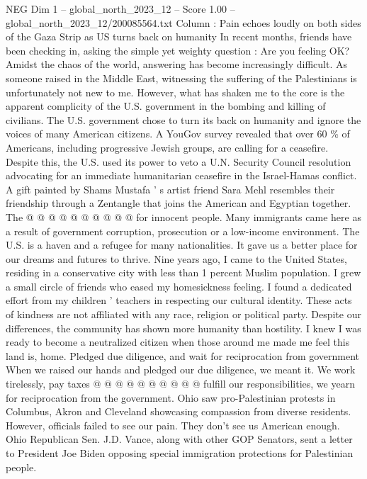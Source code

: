 \begin{textsample}{NEG Dim 1 – global\_north\_2023\_12 – Score 1.00 – global\_north\_2023\_12/200085564.txt}  \label{ex:f1_neg_203}
Column : Pain echoes loudly on both sides of the Gaza Strip as US turns back on humanity In recent months, friends have been checking in, asking the simple yet weighty question : Are you feeling OK?
Amidst the chaos of the world, answering has become increasingly difficult.
As someone raised in the Middle East, witnessing the suffering of the Palestinians is unfortunately not new to me.
However, what has shaken me to the core is the apparent complicity of the U.S. government in the bombing and killing of civilians.
The U.S. government chose to turn its back on humanity and ignore the voices of many American citizens.
A YouGov survey revealed that over 60 \% of Americans, including progressive Jewish groups, are calling for a ceasefire.
Despite this, the U.S. used its power to veto a U.N.
Security Council resolution advocating for an immediate humanitarian ceasefire in the Israel-Hamas conflict.
A gift painted by Shams Mustafa ' s artist friend Sara Mehl resembles their friendship through a Zentangle that joins the American and Egyptian together.
The @ @ @ @ @ @ @ @ @ @ for innocent people.
Many immigrants came here as a result of government corruption, prosecution or a low-income environment.
The U.S. is a haven and a refugee for many nationalities.
It gave us a better place for our dreams and futures to thrive.
Nine years ago, I came to the United States, residing in a conservative city with less than 1 percent Muslim population.
I grew a small circle of friends who eased my homesickness feeling.
I found a dedicated effort from my children ' teachers in respecting our cultural identity.
These acts of kindness are not affiliated with any race, religion or political party.
Despite our differences, the community has shown more humanity than hostility.
I knew I was ready to become a neutralized citizen when those around me made me feel this land is, home.
Pledged due diligence, and wait for reciprocation from government When we raised our hands and pledged our due diligence, we meant it.
We work tirelessly, pay taxes @ @ @ @ @ @ @ @ @ @ fulfill our responsibilities, we yearn for reciprocation from the government.
Ohio saw pro-Palestinian protests in Columbus, Akron and Cleveland showcasing compassion from diverse residents.
However, officials failed to see our pain.
They don't see us American enough.
Ohio Republican Sen.
J.D.
Vance, along with other GOP Senators, sent a letter to President Joe Biden opposing special immigration protections for Palestinian people.

\end{textsample}
